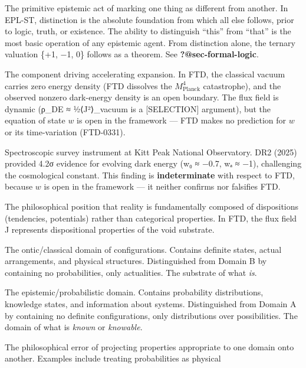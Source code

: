 \documentclass[
  11pt,
  letterpaper,
  twoside,
  openright]{book}
\providecommand{\tightlist}{%
  \setlength{\itemsep}{0pt}\setlength{\parskip}{0pt}}
\begin{document}
\begin{description}
\tightlist
\item[\textbf{Distinction}]
The primitive epistemic act of marking one thing as different from
another. In EPL-ST, distinction is the absolute foundation from which
all else follows, prior to logic, truth, or existence. The ability to
distinguish ``this'' from ``that'' is the most basic operation of any
epistemic agent. From distinction alone, the ternary valuation \{+1, −1,
0\} follows as a theorem. See \textbf{?@sec-formal-logic}.
\item[\textbf{Dark Energy}]
The component driving accelerating expansion. In FTD, the classical
vacuum carries zero energy density (FTD dissolves the
\(M_\text{Planck}^4\) catastrophe), and the observed nonzero dark-energy
density is an open boundary. The flux field is dynamic (ρ\_DE ≈
½⟨J²⟩\_vacuum is a {[}SELECTION{]} argument), but the equation of state
\(w\) is open in the framework --- FTD makes no prediction for \(w\) or
its time-variation (FTD-0331).
\item[\textbf{Dark Energy Spectroscopic Instrument (DESI)}]
Spectroscopic survey instrument at Kitt Peak National Observatory. DR2
(2025) provided 4.2σ evidence for evolving dark energy (w₀ ≈ −0.7, wₐ ≈
−1), challenging the cosmological constant. This finding is
\textbf{indeterminate} with respect to FTD, because \(w\) is open in the
framework --- it neither confirms nor falsifies FTD.
\item[\textbf{Dispositional Ontology}]
The philosophical position that reality is fundamentally composed of
dispositions (tendencies, potentials) rather than categorical
properties. In FTD, the flux field J represents dispositional properties
of the void substrate.
\item[\textbf{Domain A (𝒜)}]
The ontic/classical domain of configurations. Contains definite states,
actual arrangements, and physical structures. Distinguished from Domain
B by containing no probabilities, only actualities. The substrate of
what \emph{is}.
\item[\textbf{Domain B (ℬ)}]
The epistemic/probabilistic domain. Contains probability distributions,
knowledge states, and information about systems. Distinguished from
Domain A by containing no definite configurations, only distributions
over possibilities. The domain of what is \emph{known} or
\emph{knowable}.
\item[\textbf{Domain Confusion}]
The philosophical error of projecting properties appropriate to one
domain onto another. Examples include treating probabilities as physical

\end{description}
\end{document}
